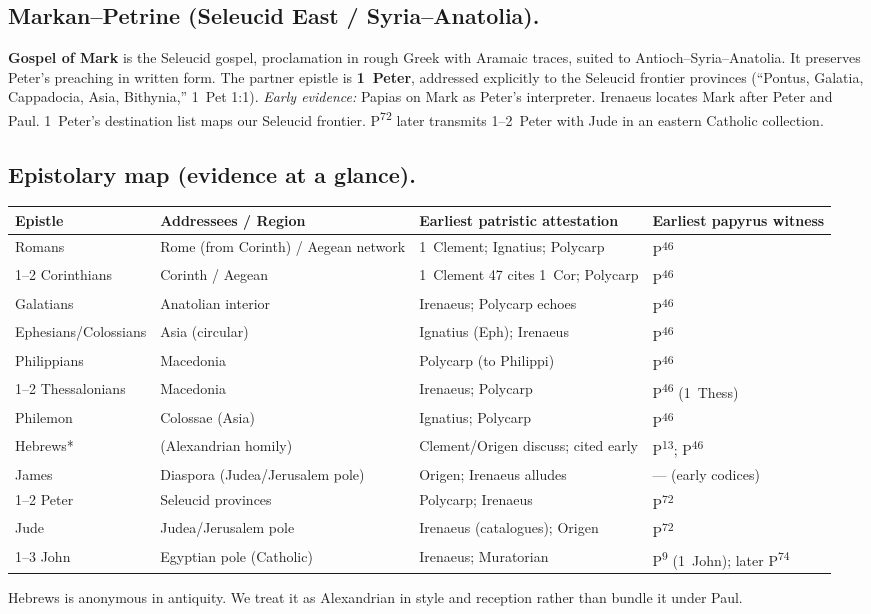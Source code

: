 \subsection{Markan–Petrine (Seleucid East / Syria–Anatolia).}
\textbf{Gospel of Mark} is the Seleucid gospel, proclamation in rough Greek with Aramaic traces, suited to Antioch–Syria–Anatolia.
It preserves Peter’s preaching in written form.
The partner epistle is \textbf{1~Peter}, addressed explicitly to the Seleucid frontier provinces (“Pontus, Galatia, Cappadocia, Asia, Bithynia,” 1~Pet 1:1).
\emph{Early evidence:} Papias on Mark as Peter’s interpreter.
Irenaeus locates Mark after Peter and Paul.
1~Peter’s destination list maps our Seleucid frontier.
P\textsuperscript{72} later transmits 1–2~Peter with Jude in an eastern Catholic collection.

\subsection{Epistolary map (evidence at a glance).}
\begin{center}
\begin{tabular}{@{}p{3.1cm}p{3.3cm}p{3.8cm}p{4.0cm}@{}}
\toprule
\textbf{Epistle} & \textbf{Addressees / Region} & \textbf{Earliest patristic attestation} & \textbf{Earliest papyrus witness} \\
\midrule
Romans & Rome (from Corinth) / Aegean network & 1~Clement; Ignatius; Polycarp & P\textsuperscript{46} \\
1–2 Corinthians & Corinth / Aegean & 1~Clement 47 cites 1~Cor; Polycarp & P\textsuperscript{46} \\
Galatians & Anatolian interior & Irenaeus; Polycarp echoes & P\textsuperscript{46} \\
Ephesians/Colossians & Asia (circular) & Ignatius (Eph); Irenaeus & P\textsuperscript{46} \\
Philippians & Macedonia & Polycarp (to Philippi) & P\textsuperscript{46} \\
1–2 Thessalonians & Macedonia & Irenaeus; Polycarp & P\textsuperscript{46} (1~Thess) \\
Philemon & Colossae (Asia) & Ignatius; Polycarp & P\textsuperscript{46} \\
Hebrews* & (Alexandrian homily) & Clement/Origen discuss; cited early & P\textsuperscript{13}; P\textsuperscript{46} \\
James & Diaspora (Judea/Jerusalem pole) & Origen; Irenaeus alludes & — (early codices) \\
1–2 Peter & Seleucid provinces & Polycarp; Irenaeus & P\textsuperscript{72} \\
Jude & Judea/Jerusalem pole & Irenaeus (catalogues); Origen & P\textsuperscript{72} \\
1–3 John & Egyptian pole (Catholic) & Irenaeus; Muratorian & P\textsuperscript{9} (1~John); later P\textsuperscript{74} \\
\bottomrule
\end{tabular}
\end{center}
\noindent *Hebrews is anonymous in antiquity.
We treat it as Alexandrian in style and reception rather than bundle it under Paul.


